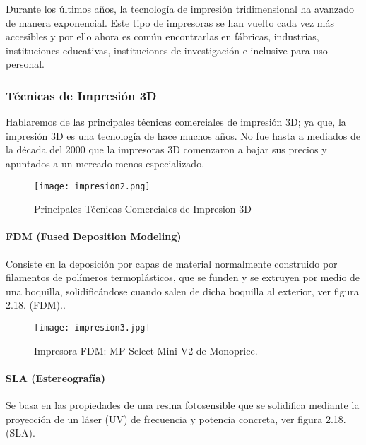 \par \noindent
Durante los últimos años, la tecnología de impresión tridimensional ha avanzado de
manera exponencial. Este tipo de impresoras se han vuelto cada vez más accesibles y por ello
ahora es común encontrarlas en fábricas, industrias, instituciones educativas, instituciones de
investigación e inclusive para uso personal\cite{impresoras3d-monterrey}.

\subsubsection{Técnicas de Impresión 3D}

\par \noindent
Hablaremos de las principales técnicas comerciales de impresión 3D; ya que, la impresión 3D es una tecnología de hace muchos años. No fue hasta a mediados de la década del 2000 que la impresoras 3D comenzaron a bajar sus precios y apuntados a un mercado menos especializado.

\begin{figure}[H]
	\centering
	\texttt{[image: impresion2.png]}
	\caption{Principales Técnicas Comerciales de Impresion 3D}
\end{figure}

\paragraph{FDM (Fused Deposition Modeling)}
Consiste en la deposición por capas de material normalmente construido por filamentos de polímeros termoplásticos, que se funden y se extruyen por medio de una boquilla, solidificándose cuando salen de dicha boquilla al exterior, ver figura 2.18. (FDM).\cite{impresoras3d-valverde}.

\begin{figure}[H]
	\centering
	\texttt{[image: impresion3.jpg]}
	\caption{Impresora FDM: MP Select Mini V2 de Monoprice.}
\end{figure}

\clearpage

\paragraph{SLA (Estereografía)}
Se basa en las propiedades de una resina fotosensible que se solidifica mediante la proyección de un láser (UV) de frecuencia y potencia concreta, ver figura 2.18. (SLA)\cite{impresoras3d-valverde}.

